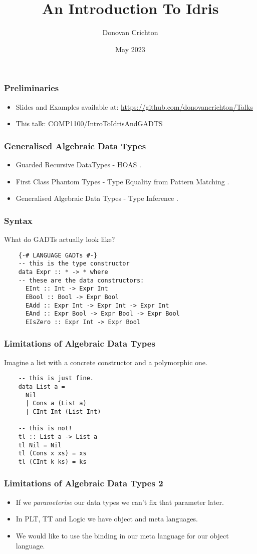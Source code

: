 \documentclass[hyperref={colorlinks = true,linkcolor = blue, citecolor = blue, urlcolor = blue}]{beamer}
\title{An Introduction To Idris}
\author{Donovan Crichton}
\date{May 2023}
\begin{document}
 
\frame{\titlepage}

\begin{frame}[fragile]
  \frametitle{Preliminaries}
  \begin{itemize}
  \item Slides and Examples available at:
    \url{https://github.com/donovancrichton/Talks}
  \item This talk: COMP1100/IntroToIdrisAndGADTS
  \end{itemize}
\end{frame}

\begin{frame}[fragile]
\frametitle{Generalised Algebraic Data Types}
\begin{itemize}
  \item Guarded Recursive DataTypes - HOAS \citep{xi2003guarded}.
  \item First Class Phantom Types - Type Equality from Pattern Matching \citep{cheney2003first}.
  \item Generalised Algebraic Data Types - Type Inference \citep{jones2004wobbly}.
\end{itemize}
\end{frame}

\begin{frame}[fragile]
  \frametitle{Syntax}
  What do GADTs actually look like?
  \begin{verbatim}
    {-# LANGUAGE GADTs #-}
    -- this is the type constructor
    data Expr :: * -> * where
    -- these are the data constructors:
      EInt :: Int -> Expr Int
      EBool :: Bool -> Expr Bool
      EAdd :: Expr Int -> Expr Int -> Expr Int
      EAnd :: Expr Bool -> Expr Bool -> Expr Bool
      EIsZero :: Expr Int -> Expr Bool
  \end{verbatim}
\end{frame}

\begin{frame}[fragile]
  \frametitle{Limitations of Algebraic Data Types}
  Imagine a list with a concrete constructor and a polymorphic one.
  \begin{verbatim}
    -- this is just fine.
    data List a =
      Nil
      | Cons a (List a)
      | CInt Int (List Int)

    -- this is not! 
    tl :: List a -> List a
    tl Nil = Nil
    tl (Cons x xs) = xs
    tl (CInt k ks) = ks
  \end{verbatim}
\end{frame}

\begin{frame}[fragile]
\frametitle{Limitations of Algebraic Data Types 2}
\begin{itemize}
  \item If we \emph{parameterise} our data types we can't fix that parameter later.
  \item In PLT, TT and Logic we have object and meta languages.
  \item We would like to use the binding in our meta language for our object language.
\end{itemize}
\end{frame}
\end{document}
